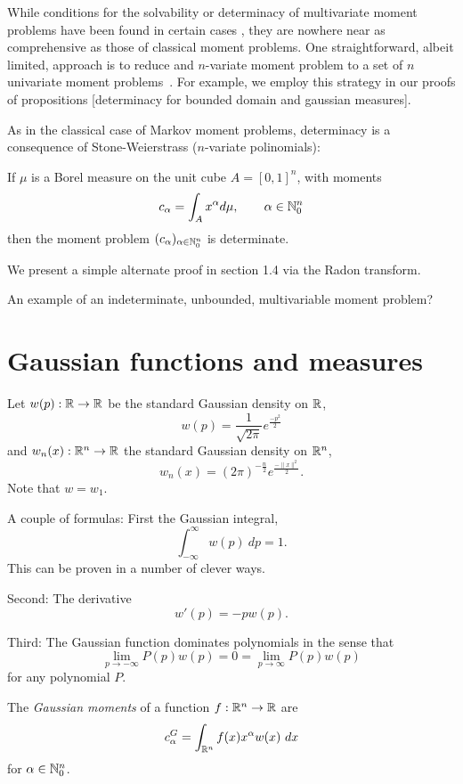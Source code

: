 While conditions for the solvability or determinacy of multivariate moment problems have been found in certain cases \cn, they are nowhere near as comprehensive as those of classical moment problems. One straightforward, albeit limited, approach is to reduce and $n$-variate moment problem to a set of $n$ univariate moment problems~\cite{Pete82}. For example, we employ this strategy in our proofs of propositions [determinacy for bounded domain and gaussian measures].

As in the classical case of Markov moment problems, determinacy is a consequence of Stone-Weierstrass ($n$-variate polinomials):
\begin{proposition}
  If $\mu$ is a Borel measure on the unit cube $A = {[0,1]}^n$, with moments
  \[
    c_\alpha = \int_{A} x^\alpha d\mu, \qquad \alpha \in \mathbb{N}_0^n
  \]
  then the moment problem $(c_\alpha)_{\alpha \in \mathbb{N}_0^n}$ is determinate.
\end{proposition}
We present a simple alternate proof in section 1.4 via the Radon transform.

\begin{myexample}
  An example of an indeterminate, unbounded, multivariable moment problem?
\end{myexample}

\section{Gaussian functions and measures}
\begin{definition}
  Let $w(p) : \mathbb{R} \rightarrow \mathbb{R}$  be the standard Gaussian density on $\mathbb{R}$,
  \[
    w(p) = \frac1{\sqrt{2\pi}} e^{\frac{-p^2}2}
  \]
  and $w_n(x) : \mathbb{R}^n \rightarrow \mathbb{R}$ the standard Gaussian density on $\mathbb{R}^n$,
  \[
    w_n(x) = {(2\pi)}^{-\frac n2} e^{\frac{-\|x\|^2}2}.
  \]
  Note that $w = w_1$.
\end{definition}

A couple of formulas: First the Gaussian integral,
\[
  \int_{-\infty}^\infty w(p) ~dp = 1.
\]
This can be proven in a number of clever ways.

Second: The derivative
\[
  w'(p) = -pw(p).
\]

Third: The Gaussian function dominates polynomials in the sense that
\[
  \lim_{p \rightarrow -\infty} P(p)w(p) = 0 = \lim_{p \rightarrow \infty} P(p)w(p)
\]
for any polynomial $P$.

\begin{definition}
  The \textit{Gaussian moments} of a function $f: \mathbb{R}^n \rightarrow \mathbb{R}$ are
  \[
    c^G_\alpha = \int_{\mathbb{R}^n} f(x)x^\alpha w(x) ~dx
  \]
  for $\alpha \in \mathbb{N}_0^n$.
\end{definition}

